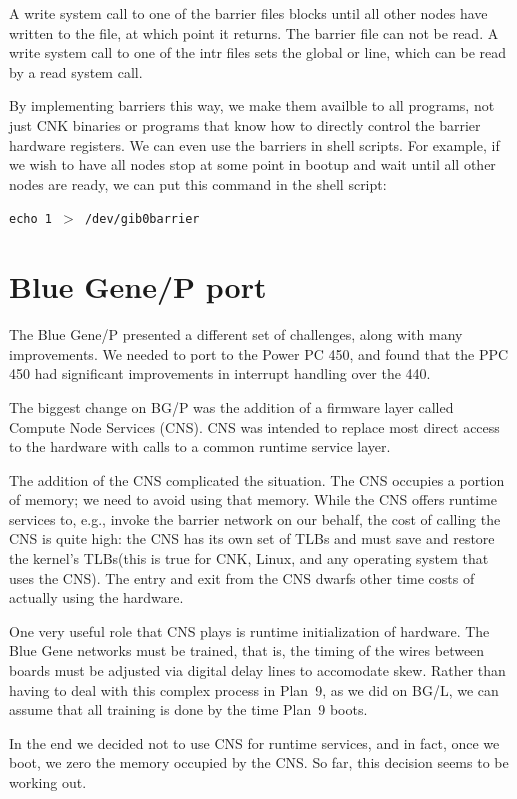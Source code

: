 \documentclass[letterpaper,twocolumn,10pt]{article}
\begin{document}
A write system call to one of the barrier files blocks until all other nodes have written to the file, at which point it returns. The barrier file can not be read. A write system call to one of the intr files sets the global or line, which can be read by a read system call. 

By implementing barriers this way, we make them availble to all programs, not just CNK binaries or programs that know how to directly control the barrier hardware registers. We can even use the barriers in shell scripts. For example, if we wish to have all nodes stop at some point in bootup and wait until all other nodes are ready, we can put this command in the shell script: 

\texttt{echo 1 $>$ /dev/gib0barrier}
\section{Blue Gene/P port}
The Blue Gene/P presented a different set of challenges, along with many improvements. We needed to port to the Power PC 450, and found that the PPC 450 had significant improvements in interrupt handling over the 440. 

The biggest change on BG/P was the addition of a firmware layer called Compute Node Services (CNS). CNS was intended to replace most direct access to the hardware with calls to a common runtime service layer.

The addition of the CNS complicated the situation. The CNS occupies a portion of memory; we need to avoid using that memory. While the CNS offers runtime services to, e.g., invoke the barrier network on our behalf, the cost of calling the CNS is quite high: the CNS has its own set of TLBs and must save and restore the kernel's TLBs(this is true for CNK, Linux, and any operating system that uses the CNS). The entry and exit from the CNS dwarfs other time costs of actually using the hardware. 

One very useful role that CNS plays is runtime initialization of hardware. The Blue Gene networks must be trained, that is, the timing of the wires between boards must be adjusted via digital delay lines to accomodate skew. Rather than having to deal with this complex process in Plan~9, as we did on BG/L, we can assume that all training is done by the time Plan~9 boots. 

In the end we decided not to use CNS for runtime services, and in fact, once we boot, we zero the memory occupied by the CNS. So far, this decision seems to be working out. 
\end{document}
